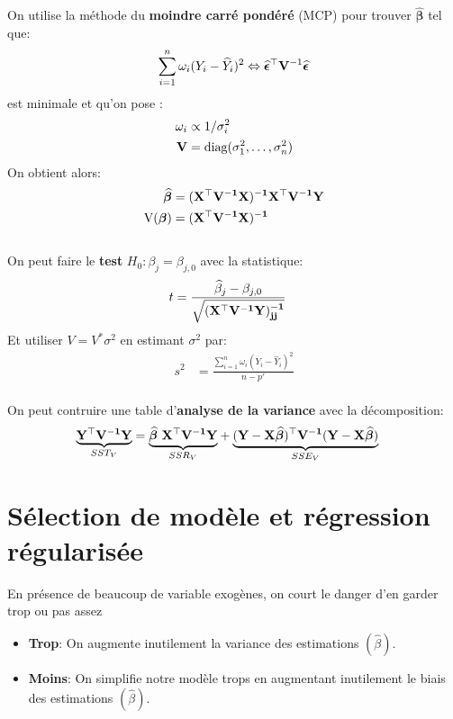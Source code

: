 \documentclass[10pt, french]{article}
\begin{document}
\begin{multicols*}{3}
\begin{tikzpicture}[x=0.75pt,y=0.75pt,yscale=-1,xscale=1]
\end{tikzpicture}


On utilise la méthode du \textbf{moindre carré pondéré} (MCP) pour trouver $\widehat{\bm{\beta}}$ tel que:
\[
	\sum_{i = 1}^{n} \omega_{i}(Y_{i} - \widehat{Y}_i)^{2} \Leftrightarrow \widehat{\bm{\epsilon}}^{\top} \matr{V}^{-1} \widehat{\bm{\epsilon}}
	\]
est minimale et qu'on pose :
\begin{align*}
\omega_{i} &\propto 1/\sigma^{2}_{i} \\
\matr{V} &= \text{diag}(\sigma_{1}^{2}, \dots, \sigma_{n}^{2})
\end{align*}
On obtient alors:
\begin{align*}
	\widehat{\bm{\beta}} &= \matr{(X^{\top}V^{-1}X)^{-1}X^{\top}V^{-1}Y} \\
	\text{V}(\bm{\beta}) &= \matr{(X^{\top}V^{-1}X)^{-1}}
\end{align*}
\\
On peut faire le \textbf{test} $H_0 : \beta_j = \beta_{j, 0}$ avec la statistique:
\begin{align*}
	t &= \frac{\widehat{\beta}_{j} - \beta_{j, 0}}{\sqrt{(\matr{X^{\top}V^{-1}Y)^{-1}_{jj}}}}
\end{align*}
Et utiliser $V = V^{*}\sigma^{2}$ en estimant $\sigma^{2}$ par:
\begin{align*}
	s^{2} &= \frac{\sum_{i = 1}^{n} \omega_{i}(Y_{i} - \widehat{Y}_i)^{2}}{n - p'}
\end{align*}
\\
On peut contruire une table d'\textbf{analyse de la variance} avec la décomposition:
\begin{align*}
	\underset{SST_V}{\underbrace{\matr{Y^{\top}V^{-1}Y}}} &= \underset{SSR_V}{\underbrace{\bm{\widehat{\beta}} \ \matr{X^{\top}V^{-1}Y}}} + \underset{SSE_V}{\underbrace{(\matr{Y - X}\bm{\widehat{\beta}})^{\top}\matr{V^{-1}}(\matr{Y - X}\bm{\widehat{\beta}}) }}
\end{align*}

\section{Sélection de modèle et régression régularisée}
En présence de beaucoup de variable exogènes, on court le danger d'en garder trop ou pas assez
\begin{itemize}
	\item \textbf{Trop}: On augmente inutilement la variance des estimations $(\hat{\beta})$.
	\item \textbf{Moins}: On simplifie notre modèle trops en augmentant inutilement le biais des estimations $(\hat{\beta})$.
\end{itemize}


\end{multicols*}
\end{document}
